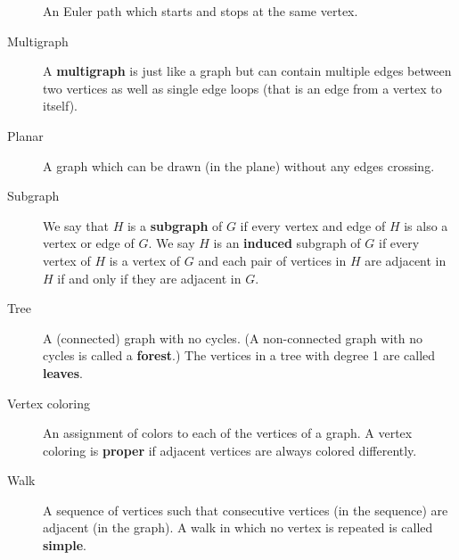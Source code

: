 \documentclass[10pt,]{book}
\newcommand{\terminology}[1]{\textbf{#1}}
\theoremstyle{plain}
\theoremstyle{definition}
\theoremstyle{definition}
\theoremstyle{definition}
\theoremstyle{definition}
\numberwithin{equation}{chapter}
\begin{document}
\begin{description}
 An Euler path which starts and stops at the same vertex.%
\item[{Multigraph}]\hypertarget{li-22}{}\hypertarget{p-93}{}%
 A \terminology{multigraph} is just like a graph but can contain multiple edges between two vertices as well as single edge loops (that is an edge from a vertex to itself).%
\item[{Planar}]\hypertarget{li-23}{}\hypertarget{p-94}{}%
 A graph which can be drawn (in the plane) without any edges crossing.%
\item[{Subgraph}]\hypertarget{li-24}{}\hypertarget{p-95}{}%
 We say that \(H\) is a \terminology{subgraph} of \(G\) if every vertex and edge of \(H\) is also a vertex or edge of \(G\). We say \(H\) is an \terminology{induced} subgraph of \(G\) if every vertex of \(H\) is a vertex of \(G\) and each pair of vertices in \(H\) are adjacent in \(H\) if and only if they are adjacent in \(G\).%
\item[{Tree}]\hypertarget{li-25}{}\hypertarget{p-96}{}%
 A (connected) graph with no cycles. (A non-connected graph with no cycles is called a \terminology{forest}.) The vertices in a tree with degree 1 are called \terminology{leaves}.%
\item[{Vertex coloring}]\hypertarget{li-26}{}\hypertarget{p-97}{}%
 An assignment of colors to each of the vertices of a graph. A vertex coloring is \terminology{proper} if adjacent vertices are always colored differently.%
\item[{Walk}]\hypertarget{li-27}{}\hypertarget{p-98}{}%
 A sequence of vertices such that consecutive vertices (in the sequence) are adjacent (in the graph). A walk in which no vertex is repeated is called \terminology{simple}.%
\end{description}
%
\typeout{************************************************}
\typeout{************************************************}
\end{document}
